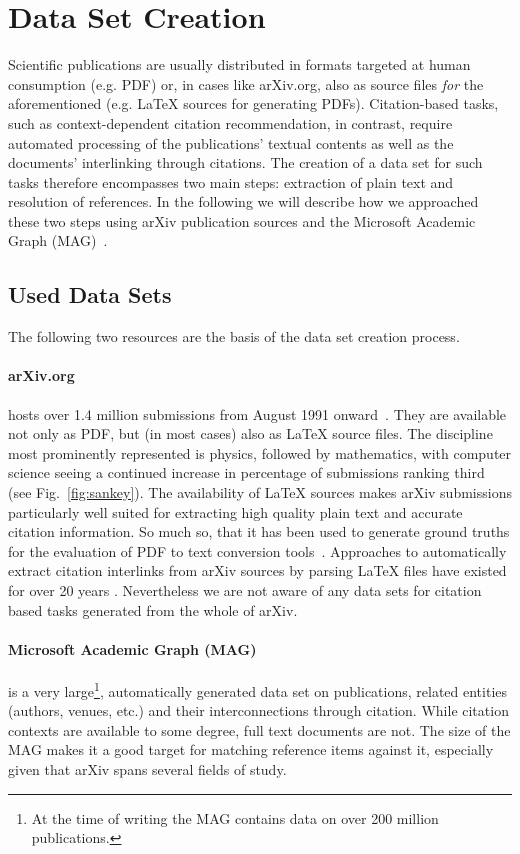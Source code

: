\section{Data Set Creation}\label{sec:data-set-creation}
Scientific publications are usually distributed in formats targeted at human consumption (e.g. PDF) or, in cases like arXiv.org, also as source files \emph{for} the aforementioned (e.g. \LaTeX{} sources for generating PDFs). Citation-based tasks, such as context-dependent citation recommendation, in contrast, require automated processing of the publications' textual contents as well as the documents' interlinking through citations. The creation of a data set for such tasks therefore encompasses two main steps: extraction of plain text and resolution of references. In the following we will describe how we approached these two steps using arXiv publication sources and the Microsoft Academic Graph (MAG)~\cite{Sinha2015}.

\subsection{Used Data Sets}

The following two resources are the basis of the data set creation process.

\paragraph{arXiv.org} hosts over 1.4 million submissions from August 1991 onward~\cite{Ginsparg1994}. They are available not only as PDF, but (in most cases) also as \LaTeX{} source files. The discipline most prominently represented is physics, followed by mathematics, with computer science seeing a continued increase in percentage of submissions ranking third (see Fig.~\ref{fig:sankey}). The availability of \LaTeX{} sources makes arXiv submissions particularly well suited for extracting high quality plain text and accurate citation information. So much so, that it has been used to generate ground truths for the evaluation of PDF to text conversion tools~\cite{Bast2017}. Approaches to automatically extract citation interlinks from arXiv sources by parsing \LaTeX{} files have existed for over 20 years \cite{Nanba1998}. Nevertheless we are not aware of any data sets for citation based tasks generated from the whole of arXiv.

\paragraph{Microsoft Academic Graph (MAG)} is a very large\footnote{At the time of writing the MAG contains data on over 200 million publications.}, automatically generated data set on publications, related entities (authors, venues, etc.) and their interconnections through citation. While citation contexts are available to some degree, full text documents are not. The size of the MAG makes it a good target for matching reference items against it, especially given that arXiv spans several fields of study.

